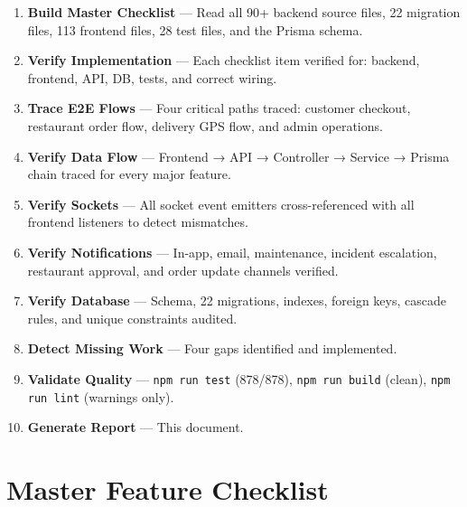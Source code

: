 \documentclass[11pt,a4paper]{article}
\begin{document}
\begin{enumerate}[leftmargin=*,label=\textbf{Step \arabic*.},itemsep=4pt]
  \item \textbf{Build Master Checklist} — Read all 90+ backend source files,
    22 migration files, 113 frontend files, 28 test files, and the Prisma schema.
  \item \textbf{Verify Implementation} — Each checklist item verified for:
    backend, frontend, API, DB, tests, and correct wiring.
  \item \textbf{Trace E2E Flows} — Four critical paths traced: customer checkout,
    restaurant order flow, delivery GPS flow, and admin operations.
  \item \textbf{Verify Data Flow} — Frontend → API → Controller → Service → Prisma
    chain traced for every major feature.
  \item \textbf{Verify Sockets} — All socket event emitters cross-referenced with
    all frontend listeners to detect mismatches.
  \item \textbf{Verify Notifications} — In-app, email, maintenance, incident
    escalation, restaurant approval, and order update channels verified.
  \item \textbf{Verify Database} — Schema, 22 migrations, indexes, foreign keys,
    cascade rules, and unique constraints audited.
  \item \textbf{Detect Missing Work} — Four gaps identified and implemented.
  \item \textbf{Validate Quality} — \texttt{npm run test} (878/878),
    \texttt{npm run build} (clean), \texttt{npm run lint} (warnings only).
  \item \textbf{Generate Report} — This document.
\end{enumerate}

\section{Master Feature Checklist}
\end{document}
